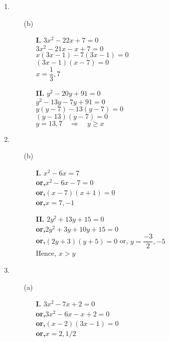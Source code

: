 \begin{multicols}{2}
\begin{enumerate}
\begin{itemize}
\end{itemize}
\item
\begin{itemize}
\item[(b)]
\begin{itemize}
\item[{\bf I.}] $3x^2 - 22x + 7 = 0$\\
  $3x^2 - 21x - x + 7 = 0$\\
  $x(3x - 1) - 7(3x - 1) = 0$\\
  $(3x - 1)(x - 7) = 0$\\
  $x = \dfrac{1}{3}, 7$

\item[{\bf II.}] $y^2 - 20y + 91 = 0$\\
  $y^2 - 13y - 7y + 91 = 0$\\
  $y(y - 7) - 13 (y - 7) = 0$\\
  $(y - 13)(y - 7) = 0$\\
  $y = 13, 7 \quad \Rightarrow \quad y \geq x$
\end{itemize}
\end{itemize}
\item
\begin{itemize}
\item[(b)]
\begin{itemize}
\item[{\bf I.}] $x^2 - 6x = 7$\\
{\bf or,}\quad $x^2 - 6x - 7 = 0$\\
{\bf or,}\quad $(x - 7)(x + 1) = 0$\\
{\bf or,}\quad $x = 7, -1$
\item[{\bf II.}] $2y^2 + 13y + 15 = 0$\\
{\bf or,}\quad $2y^2 + 3y + 10y + 15 = 0$\\
{\bf or,}\quad $(2y + 3)(y + 5) = 0$ or, $y = \dfrac{-3}{2}, -5$\\
Hence, $x > y$
\end{itemize}
\end{itemize}
\item
\begin{itemize}
\item[(a)]
\begin{itemize}
\item[{\bf I.}] $3x^2 - 7x + 2 = 0$\\
  {\bf or,}\quad $3x^2 - 6x - x + 2 = 0$\\
  {\bf or,}\quad $(x - 2)(3x - 1) = 0$\\
  {\bf or,}\quad $x = 2, 1/2$


\end{itemize}
\end{itemize}
\end{enumerate}
\end{multicols}
